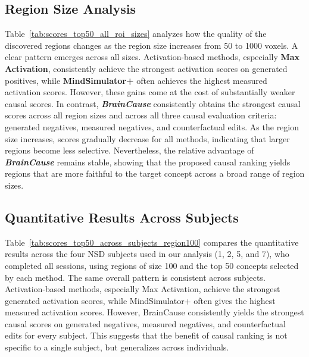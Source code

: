 \documentclass{article}
\begin{document}



\clearpage

\subsection{Region Size Analysis}
\label{sec_sup:Region_size}

Table~\ref{tab:scores_top50_all_roi_sizes} analyzes how the quality of the discovered regions changes as the region size increases from 50 to 1000 voxels. A clear pattern emerges across all sizes. Activation-based methods, especially \textbf{Max Activation}, consistently achieve the strongest activation scores on generated positives, while \textbf{MindSimulator+} often achieves the highest measured activation scores. However, these gains come at the cost of substantially weaker causal scores. In contrast, \emph{\textbf{BrainCause}} consistently obtains the strongest causal scores across all region sizes and across all three causal evaluation criteria: generated negatives, measured negatives, and counterfactual edits. As the region size increases, scores gradually decrease for all methods, indicating that larger regions become less selective. Nevertheless, the relative advantage of \emph{\textbf{BrainCause}} remains stable, showing that the proposed causal ranking yields regions that are more faithful to the target concept across a broad range of region sizes.







\clearpage
\subsection{Quantitative Results Across Subjects}
\label{sec_sup:Quantitative_across_sbuecjts}

Table~\ref{tab:scores_top50_across_subjects_region100} compares the quantitative results across the four NSD subjects used in our analysis (1, 2, 5, and 7), who completed all sessions, using regions of size 100 and the top 50 concepts selected by each method. The same overall pattern is consistent across subjects. Activation-based methods, especially Max Activation, achieve the strongest generated activation scores, while MindSimulator+ often gives the highest measured activation scores. However, BrainCause consistently yields the strongest causal scores on generated negatives, measured negatives, and counterfactual edits for every subject. This suggests that the benefit of causal ranking is not specific to a single subject, but generalizes across individuals.
\end{document}
